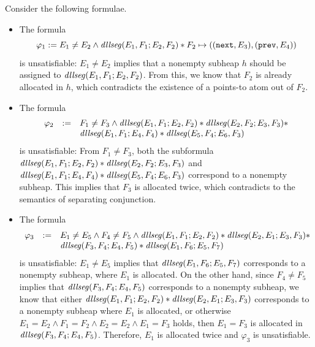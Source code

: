 \documentclass{llncs}
\begin{document}
\begin{example}\label{exmp-dllseg-sat}
Consider the following formulae.
\begin{itemize}
\item The formula 
$$\varphi_1:= E_1 \neq E_2 \wedge \mathit{dllseg}(E_1,F_1; E_2, F_2) \ast F_2 \mapsto ((\mathtt{next},E_3),(\mathtt{prev},E_4))$$ 
is unsatisfiable: $E_1 \neq E_2$ implies that a nonempty subheap $h$ should be assigned to $\mathit{dllseg}(E_1, F_1; E_2, F_2)$. From this, we know that $F_2$ is already allocated in $h$, which contradicts the existence of a points-to atom out of $F_2$.
%
\item The formula 
$$
\begin{array}{l c l}
\varphi_2 & := & F_1 \neq F_3 \wedge \mathit{dllseg}(E_1, F_1; E_2, F_2) \ast  \mathit{dllseg}(E_2, F_2; E_3, F_3) \ast \\
& & \mathit{dllseg}(E_1, F_1; E_4, F_4) \ast \mathit{dllseg}(E_5, F_4; E_6, F_3)
\end{array}
$$ 
is unsatisfiable: From $F_1 \neq F_3$,  both the subformula $\mathit{dllseg}(E_1, F_1; E_2, F_2) \ast  \mathit{dllseg}(E_2, F_2; E_3, F_3)$ and $\mathit{dllseg}(E_1, F_1; E_4, F_4) \ast \mathit{dllseg}(E_5, F_4; E_6, F_3)$ correspond to a nonempty subheap. This implies that $F_3$ is allocated twice, which contradicts to the semantics of separating conjunction.
%
\item The formula 
$$
\begin{array}{l c l}
\varphi_3 &:=& E_1 \neq E_5 \wedge F_4 \neq F_5 \wedge \mathit{dllseg}(E_1, F_1; E_2, F_2) \ast \mathit{dllseg}(E_2, E_1; E_3, F_3) \ast \\
& & \mathit{dllseg}(F_3, F_4; E_4, F_5) \ast \mathit{dllseg}(E_1, F_6; E_5, F_7)
\end{array}
$$ 
is unsatisfiable: $E_1 \neq E_5$ implies that $\mathit{dllseg}(E_1, F_6; E_5, F_7)$ corresponds to a nonempty subheap, where $E_1$ is allocated. On the other hand, since $F_4 \neq F_5$ implies that $\mathit{dllseg}(F_3, F_4; E_4, F_5)$ corresponds to a nonempty subheap, we know that either $\mathit{dllseg}(E_1, F_1; E_2, F_2) \ast \mathit{dllseg}(E_2, E_1; E_3, F_3)$ corresponds to a nonempty subheap where $E_1$ is allocated, or otherwise $E_1 = E_2 \wedge F_1 = F_2 \wedge E_2 = E_2 \wedge E_1 = F_3$ holds, then $E_1=F_3$ is allocated in $\mathit{dllseg}(F_3, F_4; E_4, F_5)$. Therefore, $E_1$ is allocated twice and $\varphi_3$ is unsatisfiable.
\end{itemize}
\end{example}


\newcommand\couple{\mathsf{Cpl}}
\end{document}
